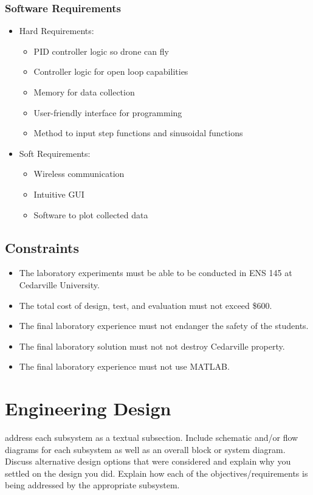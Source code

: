 \documentclass[12pt, titlepage]{article}
\begin{document}
\subsubsection{Software Requirements}
\begin{itemize}
  \item Hard Requirements:
  \begin{itemize}
    \item PID controller logic so drone can fly
    \item Controller logic for open loop capabilities
    \item Memory for data collection
    \item User-friendly interface for programming
    \item Method to input step functions and sinusoidal functions
  \end{itemize}
  \item Soft Requirements:
  \begin{itemize}
    \item Wireless communication
    \item Intuitive GUI
    \item Software to plot collected data
  \end{itemize}
\end{itemize}
\subsection{Constraints}
\begin{itemize}
  \item The laboratory experiments must be able to be conducted in ENS 145 at Cedarville University.
  \item The total cost of design, test, and evaluation must not exceed \$600.
  \item The final laboratory experience must not endanger the safety of the students.
  \item The final laboratory solution must not not destroy Cedarville property.
  \item The final laboratory experience must not use MATLAB.
\end{itemize}

\section{Engineering Design}
address each subsystem as a textual subsection. Include schematic and/or flow diagrams for each subsystem as well as an overall block or system diagram. Discuss alternative design options that were considered and explain why you settled on the design you did. Explain how each of the objectives/requirements is being addressed by the appropriate subsystem.
\end{document}
